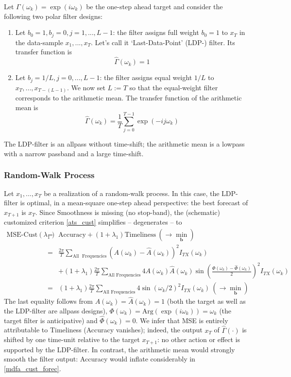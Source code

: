 \documentclass[a4paper]{book}
\begin{document}
Let $\Gamma(\omega_k)=\exp(i\omega_k)$ be the one-step ahead target and consider the following two polar filter designs: 
\begin{enumerate}
\item Let $b_0=1,b_j=0,j=1,...,L-1$: the filter assigns full weight $b_0=1$ to $x_T$ in the data-sample $x_1,...,x_T$. Let's call it `Last-Data-Point' (LDP-) filter. Its transfer function is
\[\hat{\Gamma}(\omega_k)=1\]
\item Let $b_j=1/L,j=0,...,L-1$: the filter assigns equal weight $1/L$ to $x_T,...,x_{T-(L-1)}$. We now set $L:=T$ so that the equal-weight filter corresponds to the arithmetic mean. The transfer function of the arithmetic mean is
\[\hat{\Gamma}(\omega_k)=\frac{1}{T}\sum_{j=0}^{T-1}\exp(-ij\omega_k)\]
\end{enumerate}
The LDP-filter is an allpass without time-shift; the arithmetic mean is a lowpass with a narrow passband and a large time-shift. 



\subsubsection{Random-Walk Process}

Let $x_1,...,x_T$ be a realization of a random-walk process. In this case, the LDP-filter is optimal, in a mean-square one-step ahead perspective: the best forecast of $x_{T+1}$ is $x_T$. Since Smoothness is missing (no stop-band), the (schematic) customized criterion \ref{ats_cust} simplifies -- degenerates -- to
\begin{eqnarray}
\textrm{MSE-Cust}(\lambda_1)&=&\textrm{Accuracy}+(1+\lambda_1) \textrm{Timeliness}~\left(\to\min_{\mathbf{b}}\right)\label{mdfa_cust_forec}\\
&=&\frac{2\pi}{ T} \sum_{\textrm{All ~Frequencies}} (A(\omega_k)-\hat{A}(\omega_k))^2 I_{TX}(\omega_k)\nonumber\\
&&+(1+\lambda_1)\frac{2\pi}{ T}  \sum_{\textrm{All~Frequencies}} 4A(\omega_k)\hat{A}(\omega_k)\sin\left(\frac{\Phi(\omega_k)-\hat{\Phi}(\omega_k)}{2}\right)^2I_{TX}(\omega_k)\nonumber\\
&=&(1+\lambda_1)\frac{2\pi}{ T}  \sum_{\textrm{All~Frequencies}} 4\sin\left(\omega_k/2\right)^2I_{TX}(\omega_k)~\left(\to\min_{\mathbf{b}}\right)\label{ast_cust_for}
\end{eqnarray}
The last equality follows from $A(\omega_k)=\hat{A}(\omega_k)=1$ (both the target as well as the LDP-filter are allpass designs), $\Phi(\omega_k)=\textrm{Arg}(\exp(i\omega_k))=\omega_k$ (the target filter is anticipative) and $\hat{\Phi}(\omega_k)=0$. We infer that MSE is entirely attributable to Timeliness (Accuracy vanishes); indeed, the output $x_T$ of $\hat{\Gamma}(\cdot)$ is shifted by one time-unit relative to the target $x_{T+1}$: no other action or effect is supported by the LDP-filter. In contrast, the arithmetic mean would strongly smooth the filter output: Accuracy would inflate considerably in \ref{mdfa_cust_forec}.\\
\end{document}
